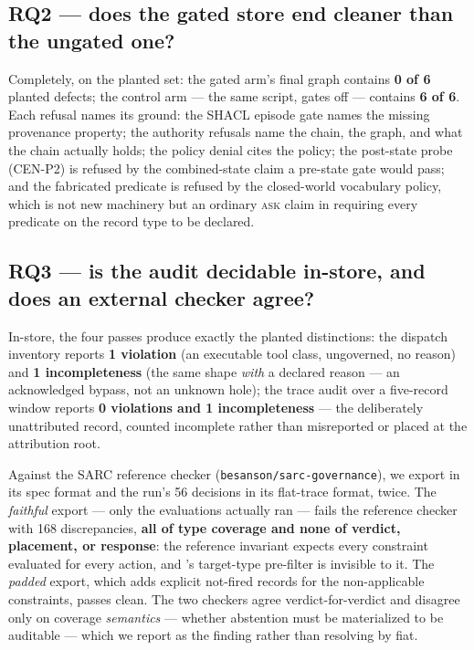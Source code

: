 \subsection{RQ2 --- does the gated store end cleaner than the ungated one?}
Completely, on the planted set: the gated arm's final graph contains
\textbf{0 of 6} planted defects; the control arm --- the same script,
gates off --- contains \textbf{6 of 6}. Each refusal names its ground:
the SHACL episode gate names the missing provenance property; the
authority refusals name the chain, the graph, and what the chain
actually holds; the policy denial cites the policy; the post-state
probe (CEN-P2) is refused by the combined-state claim a pre-state gate
would pass; and the fabricated predicate is refused by the
closed-world vocabulary policy, which is not new machinery but an
ordinary \textsc{ask} claim in \Sig requiring every predicate on the
record type to be declared.

\subsection{RQ3 --- is the audit decidable in-store, and does an external
checker agree?}
\label{sec:eval-audit}
In-store, the four passes produce exactly the planted distinctions:
the dispatch inventory reports \textbf{1 violation} (an executable
tool class, ungoverned, no reason) and \textbf{1 incompleteness} (the
same shape \emph{with} a declared reason --- an acknowledged bypass, not
an unknown hole); the trace audit over a five-record window reports
\textbf{0 violations and 1 incompleteness} --- the deliberately
unattributed record, counted incomplete rather than misreported or
placed at the attribution root.

Against the SARC reference checker
(\texttt{besanson/sarc-governance}), we export \Sig in its spec format
and the run's 56 decisions in its flat-trace format, twice. The
\emph{faithful} export --- only the evaluations \sys actually ran ---
fails the reference checker with 168 discrepancies, \textbf{all of
type coverage and none of verdict, placement, or response}: the
reference invariant expects every constraint evaluated for every
action, and \sys's target-type pre-filter is invisible to it. The
\emph{padded} export, which adds explicit not-fired records for the
non-applicable constraints, passes clean. The two checkers agree
verdict-for-verdict and disagree only on coverage \emph{semantics} ---
whether abstention must be materialized to be auditable --- which we
report as the finding rather than resolving by fiat.

